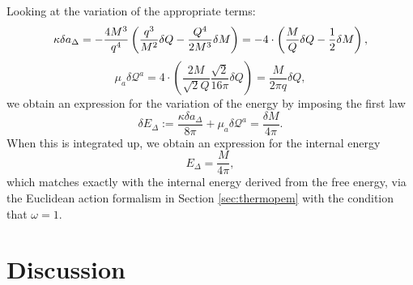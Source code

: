 Looking at the variation of the appropriate terms:
\begin{equation*}
    \kappa \delta a_\Delta = - \frac{4 M^3}{q^4} \left( \frac{q^3}{M^2} \delta Q - \frac{Q^4}{2M^3} \delta M \right) = - 4 \cdot \left( \frac MQ \delta Q - \frac{1}{2} \delta M \right),
\end{equation*}
\begin{equation*}
    \mu_a \delta \mathcal{Q}^a = 4 \cdot \left(\frac{2 M}{\sqrt{2} Q} \frac{\sqrt{2} }{16 \pi} \delta Q  \right) = \frac{M}{2 \pi q} \delta Q ,
\end{equation*}
we obtain an expression for the variation of the energy by imposing the first law
\begin{equation*}
    \delta E_\Delta := \frac{\kappa \delta a_\Delta}{8 \pi} + \mu_a \delta \mathcal{Q}^a = \frac{\delta M}{4 \pi}.
\end{equation*}
When this is integrated up, we obtain an expression for the internal energy
\begin{equation*}
    E_\Delta = \frac{M}{4 \pi},
\end{equation*}
which matches exactly with the internal energy derived from the free energy, via the Euclidean action formalism in Section \ref{sec:thermopem} with the condition that $\omega = 1$.


\section{Discussion}
\label{sec:thermodiscussion}

